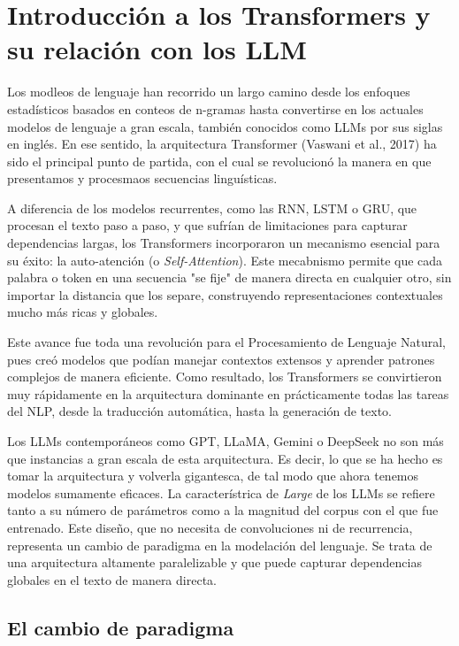 \section*{Introducción a los Transformers y su relación 
con los LLM}

Los modleos de lenguaje han recorrido un largo camino desde los enfoques estadísticos basados
en conteos de n-gramas hasta convertirse en los actuales modelos de lenguaje a gran escala, 
también conocidos como LLMs por sus siglas en inglés. En ese sentido, la arquitectura
Transformer (Vaswani et al., 2017) ha sido el principal punto de partida, con el cual se revolucionó la manera en
que presentamos y procesmaos secuencias linguísticas. 

A diferencia de los modelos recurrentes, como las RNN, LSTM o GRU, que procesan el texto paso 
a paso, y que sufrían de limitaciones para capturar dependencias largas, los Transformers 
incorporaron un mecanismo esencial para su éxito: la auto-atención (o \textit{Self-Attention}).
Este mecabnismo permite que cada palabra o token en una secuencia "se fije" de manera
directa en cualquier otro, sin importar la distancia que los separe, construyendo representaciones
contextuales mucho más ricas y globales. 

Este avance fue toda una revolución para el Procesamiento de Lenguaje Natural, pues creó 
modelos que podían manejar contextos extensos y aprender patrones complejos de manera eficiente. 
Como resultado, los Transformers se convirtieron muy rápidamente en la arquitectura dominante
en prácticamente todas las tareas del NLP, desde la traducción automática, hasta la generación 
de texto. 

Los LLMs contemporáneos como GPT, LLaMA, Gemini o DeepSeek no son más que instancias a gran
escala de esta arquitectura. Es decir, lo que se ha hecho es tomar la arquitectura y volverla
gigantesca, de tal modo que ahora tenemos modelos sumamente eficaces. La característrica de
\textit{Large} de los LLMs se refiere tanto a su número de parámetros como a la magnitud
del corpus con el que fue entrenado. Este diseño, que no necesita de convoluciones ni de 
recurrencia, representa un cambio de paradigma en la modelación del lenguaje. Se trata 
de una arquitectura altamente paralelizable y que puede capturar dependencias globales en el
texto de manera directa. 

\subsection{El cambio de paradigma}

